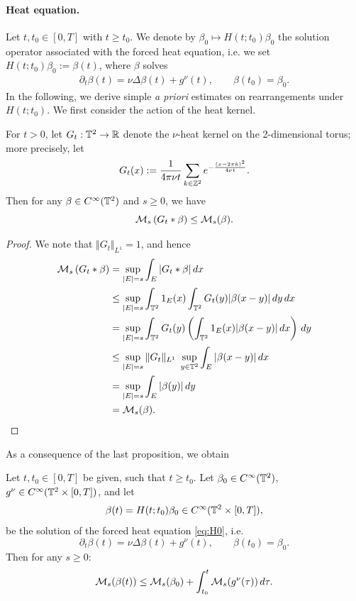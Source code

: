 \documentclass[reqno,12pt]{amsart}
\begin{document}
\paragraph*{\textbf{Heat equation.}}
Let $t, t_0\in [0,T]$ with $t\ge t_0$. We denote by $\beta_0 \mapsto H(t;t_0)\beta_0$ the solution operator associated with the forced heat equation, i.e. we set $H(t;t_0)\beta_0 := \beta(t)$, where $\beta$ solves
\begin{align}
\label{eq:H0}
\partial_t \beta(t) = \nu \Delta \beta(t) + g^\nu(t),
\qquad
\beta(t_0) = \beta_0.
\tag{H}
\end{align}
In the following, we derive simple {\it a priori} estimates on rearrangements under $H(t;t_0)$. We first consider the action of the heat kernel.
\begin{proposition}
  \label{prop:Gast}
  For $t > 0$, let $G_t: \mathbb{T}^2 \to \mathbb{R}$ denote the $\nu$-heat kernel on the 2-dimensional torus; more precisely, let
  \[
  G_t(x) := \frac{1}{4\pi \nu t} \sum_{k\in \mathbb{Z}^2} e^{-\frac{(x-2\pi k)^2}{4\nu t}}.
  \]
  Then for any $\beta \in C^\infty(\mathbb{T}^2)$ and $s\ge 0$, we have
  \[
  \mathcal{M}_s\left( G_t \ast \beta \right)
  \le
  \mathcal{M}_s(\beta).
  \]
\end{proposition}

\begin{proof}
  We note that $\Vert G_t \Vert_{L^1} = 1$, and hence
  \begin{align*}
  \mathcal{M}_s\left( G_t \ast \beta \right)
  &=
  \sup_{|E|=s}
  \int_E |G_t \ast \beta| \, dx
  \\
  &\le
  \sup_{|E|=s}
  \int_{\mathbb{T}^2} 1_E(x) \int_{\mathbb{T}^2} G_t(y) |\beta(x-y)| \, dy \, dx
  \\
  &=  \sup_{|E|=s}
  \int_{\mathbb{T}^2} G_t(y) \left( \int_{\mathbb{T}^2} 1_E(x) |\beta(x-y)| \, dx\right)  \, dy
  \\
  &\le
  \sup_{|E|=s}\Vert G_t \Vert_{L^1}
  \;
  \sup_{y\in \mathbb{T}^2}
  \int_E |\beta(x-y)| \, dx
  \\
  &= \sup_{|E|=s}
  \int_E |\beta(y)| \, dy
  \\
  &= \mathcal{M}_s(\beta).
  \end{align*}
\end{proof}


As a consequence of the last proposition, we obtain
\begin{proposition}
\label{prop:Hrearrange}
  Let $t,t_0\in [0,T]$ be given, such that $t\ge t_0$. Let $\beta_0 \in C^\infty(\mathbb{T}^2)$, $g^\nu\in C^\infty(\mathbb{T}^2 \times [0,T])$, and let
  \[
  \beta(t) = H(t;t_0)\beta_0 \in C^\infty(\mathbb{T}^2 \times [0,T]),
  \]
   be the solution of the forced heat equation \eqref{eq:H0}, i.e.
  \[
  \partial_t \beta(t) = \nu \Delta \beta(t) + g^\nu(t), \qquad \beta(t_0) = \beta_0.
  \]
  Then for any $s\ge 0$:
  \[
  \mathcal{M}_s (\beta(t))
  \le
  \mathcal{M}_s (\beta_0)
  +
  \int_{t_0}^t \mathcal{M}_s (g^\nu(\tau)) \, d\tau.
  \]
\end{proposition}
\end{document}
